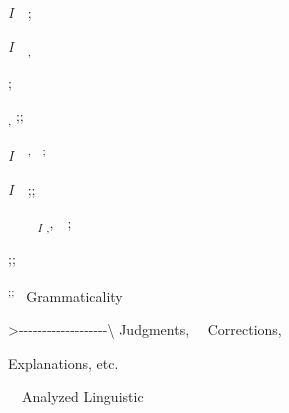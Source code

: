 \begin{styleStandard}
\textit{I\ \ };
\end{styleStandard}


\begin{styleStandard}
\textit{I\ \ }\textsubscript{,}
\end{styleStandard}


\begin{center}
\begin{minipage}{0.1264in}
\begin{styleFramecontents}
;
\end{styleFramecontents}


\end{minipage}
\end{center}
\begin{styleStandard}
\textsubscript{,}\textsubscript{ };;
\end{styleStandard}


\begin{styleStandard}
\textit{I\ \ }\textsuperscript{,\ \ }\textsuperscript{;}
\end{styleStandard}


\begin{styleStandard}
\textit{I\ \ };;
\end{styleStandard}


\begin{styleStandard}
\textsubscript{\ }\textsubscript{\ \ }\textsubscript{\ \ }\textit{\textsubscript{I}}\textit{\textsubscript{ }}\textsubscript{,},\ \ ;
\end{styleStandard}


\begin{styleStandard}
;;
\end{styleStandard}


\begin{styleStandard}
\textsuperscript{;}\textsuperscript{;\ \ }Grammaticality
\end{styleStandard}


\begin{styleStandard}
{\textgreater}-{}-{}-{}-{}-{}-{}-{}-{}-{}-{}-{}-{}-{}-{}-{}-{}-{}-{}-{\textquotesingle}{\textquotedbl}{\textbackslash} Judgments, \ \ Corrections,
\end{styleStandard}


\begin{styleStandard}
Explanations, etc.
\end{styleStandard}


\begin{styleStandard}
 \ \  Analyzed Linguistic
\end{styleStandard}


